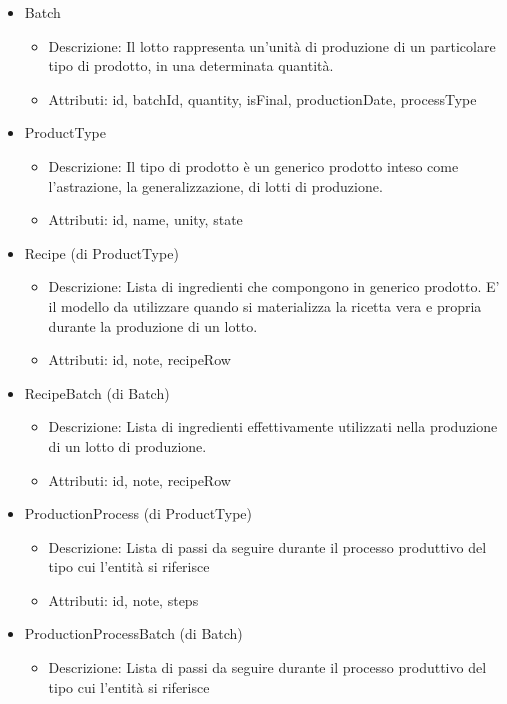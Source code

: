 \documentclass[a4paper,11pt]{article}
\begin{document}
\begin{itemize}
  \item Batch
        \begin{itemize}
          \item Descrizione: Il lotto rappresenta un'unità di produzione di un particolare tipo di prodotto, in una determinata quantità.
          \item Attributi: id, batchId, quantity, isFinal, productionDate, processType
        \end{itemize}
  \item ProductType
        \begin{itemize}
          \item Descrizione: Il tipo di prodotto è un generico prodotto inteso come l'astrazione, la generalizzazione, di lotti di produzione.
          \item Attributi: id, name, unity, state
        \end{itemize}
  \item Recipe (di ProductType)
        \begin{itemize}
          \item Descrizione: Lista di ingredienti che compongono in generico prodotto. E' il modello da utilizzare quando si materializza la ricetta vera e propria durante la produzione di un lotto.
          \item Attributi: id, note, recipeRow
        \end{itemize}
  \item RecipeBatch (di Batch)
        \begin{itemize}
          \item Descrizione: Lista di ingredienti effettivamente utilizzati nella produzione di un lotto di produzione.
          \item Attributi: id, note, recipeRow
        \end{itemize}
  \item ProductionProcess (di ProductType)
        \begin{itemize}
          \item Descrizione: Lista di passi da seguire durante il processo produttivo del tipo cui l'entità si riferisce
          \item Attributi: id, note, steps
        \end{itemize}
  \item ProductionProcessBatch (di Batch)
        \begin{itemize}
          \item Descrizione: Lista di passi da seguire durante il processo produttivo del tipo cui l'entità si riferisce

\end{itemize}
\end{itemize}
\end{document}
